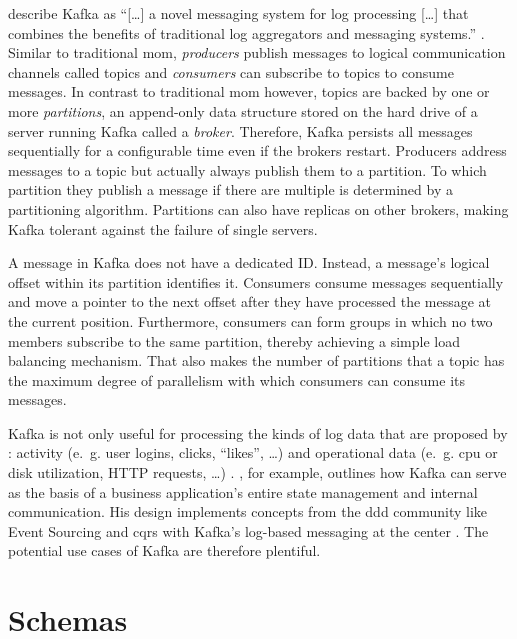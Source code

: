 \citeauthor{kreps_kafka_2011} describe Kafka as \enquote{[\ldots] a novel messaging system for log processing [\ldots] that combines the benefits of traditional log aggregators and messaging systems.} \parencite{kreps_kafka_2011}.
Similar to traditional \gls{mom}, \emph{producers} publish messages to logical communication channels called topics and \emph{consumers} can subscribe to topics to consume messages.
In contrast to traditional \gls{mom} however, topics are backed by one or more \emph{partitions}, an append-only data structure stored on the hard drive of a server running Kafka called a \emph{broker}.
Therefore, Kafka persists all messages sequentially for a configurable time even if the brokers restart.
Producers address messages to a topic but actually always publish them to a partition.
To which partition they publish a message if there are multiple is determined by a partitioning algorithm.
Partitions can also have replicas on other brokers, making Kafka tolerant against the failure of single servers.
\parencite{kreps_kafka_2011}

A message in Kafka does not have a dedicated ID.
Instead, a message's logical offset within its partition identifies it.
Consumers consume messages sequentially and move a pointer to the next offset after they have processed the message at the current position.
Furthermore, consumers can form groups in which no two members subscribe to the same partition, thereby achieving a simple load balancing mechanism.
That also makes the number of partitions that a topic has the maximum degree of parallelism with which consumers can consume its messages.
\parencite{kreps_kafka_2011}

Kafka is not only useful for processing the kinds of log data that are proposed by \citeauthor{kreps_kafka_2011}: activity (e.~g. user logins, clicks, \enquote{likes}, \ldots) and operational data (e.~g. \gls{cpu} or disk utilization, HTTP requests, \ldots) \parencite{kreps_kafka_2011}.
\citeauthor{stopford_designing_2018}, for example, outlines how Kafka can serve as the basis of a business application's entire state management and internal communication.
His design implements concepts from the \gls{ddd} community like Event Sourcing \parencite{fowler_event_sourcing_2005} and \gls{cqrs} \parencite{fowler_cqrs_2011} with Kafka's log-based messaging at the center \parencite{stopford_designing_2018}.
The potential use cases of Kafka are therefore plentiful.

\section{Schemas}

